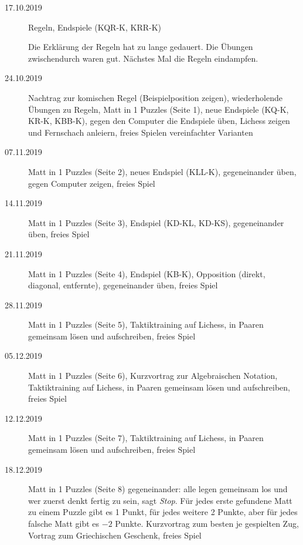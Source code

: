 \documentclass[
  a4paper,
  justified,
  nobib,
]{tufte-handout}
\begin{document}
\begin{description}
  \item[17.10.2019] Regeln, Endspiele (KQR-K, KRR-K)

    Die Erklärung der Regeln hat zu lange gedauert.
    Die Übungen zwischendurch waren gut.
    Nächstes Mal die Regeln eindampfen.

  \item[24.10.2019] Nachtrag zur komischen Regel (Beispielposition zeigen),
    wiederholende Übungen zu Regeln,
    Matt in 1 Puzzles (Seite 1),
    neue Endspiele (KQ-K, KR-K, KBB-K),
    gegen den Computer die Endspiele üben,
    Lichess zeigen und Fernschach anleiern,
    freies Spielen vereinfachter Varianten

  \item[07.11.2019] Matt in 1 Puzzles (Seite 2),
    neues Endspiel (KLL-K),
    gegeneinander üben,
    gegen Computer zeigen,
    freies Spiel

  \item[14.11.2019] Matt in 1 Puzzles (Seite 3),
    Endspiel (KD-KL, KD-KS),
    gegeneinander üben,
    freies Spiel

  \item[21.11.2019] Matt in 1 Puzzles (Seite 4),
    Endspiel (KB-K),
    Opposition (direkt, diagonal, entfernte),
    gegeneinander üben,
    freies Spiel

  \item[28.11.2019] Matt in 1 Puzzles (Seite 5),
    Taktiktraining auf Lichess,
    in Paaren gemeinsam lösen und aufschreiben,
    freies Spiel

  \item[05.12.2019] Matt in 1 Puzzles (Seite 6),
    Kurzvortrag zur Algebraischen Notation,
    Taktiktraining auf Lichess,
    in Paaren gemeinsam lösen und aufschreiben,
    freies Spiel

  \item[12.12.2019] Matt in 1 Puzzles (Seite 7),
    Taktiktraining auf Lichess,
    in Paaren gemeinsam lösen und aufschreiben,
    freies Spiel

  \item[18.12.2019] Matt in 1 Puzzles (Seite 8) gegeneinander: alle legen gemeinsam los
    und wer zuerst denkt fertig zu sein, sagt \emph{Stop}. Für jedes erste gefundene Matt
    zu einem Puzzle gibt es 1 Punkt, für jedes weitere 2 Punkte, aber für jedes falsche
    Matt gibt es $-2$ Punkte.
    Kurzvortrag zum besten je gespielten Zug,
    Vortrag zum Griechischen Geschenk,
    freies Spiel
\end{description}
\end{document}
